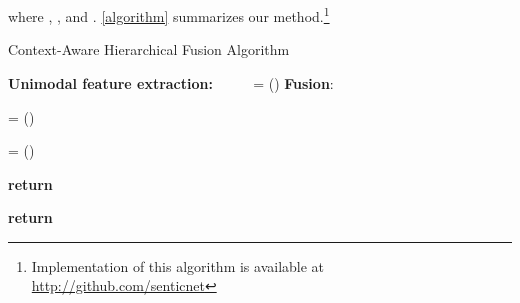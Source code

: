 \documentclass[review]{elsarticle}
\newcommand\?[1]{\hl{#1}}
\begin{document}
where , , and
. \cref{algorithm} summarizes our method.\footnote{Implementation of this algorithm is available at
  \url{http://github.com/senticnet}} 


\begin{algorithm}[!ht]
    \small
    \caption{Context-Aware Hierarchical Fusion Algorithm}\label{algorithm}
    \begin{algorithmic}[1]
        
        
        \vspace{2mm}
        \vspace{2mm}
        \State \textbf{Unimodal feature extraction:}
            \State \texttt{ }
            \State \texttt{ }
            \State \texttt{ }
        \EndFor
            \State  = ()
        \EndFor
        \vspace{2mm}
        \State \textbf{Fusion}:
        \State \texttt{ }
        \State \texttt{ }
        \State \texttt{ }

        \vspace{2mm}
        \State \texttt{}
        \State \texttt{}
        \State \texttt{}
        \State  = ()
        \EndFor
        
        \vspace{2mm}
        \State 
        \State  = ()

        \vspace{2mm}
            \State  
        \EndFor
        

        \State 
        \EndProcedure
        
        \vspace{2mm}
         
        \State 
        \State \textbf{return} 
        \EndProcedure

        \vspace{2mm}
         
        \State 
        \EndFor
        \State 
        \State \textbf{return} 
        \EndProcedure
        

\end{algorithmic}
\end{algorithm}
\end{document}
